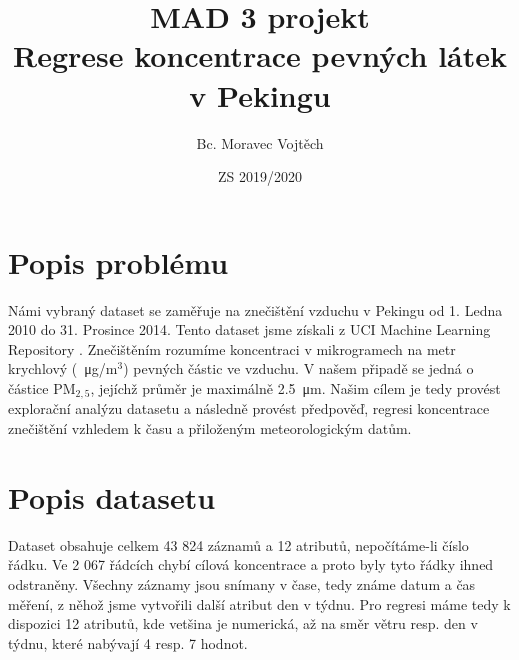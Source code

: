 \documentclass[a4paper,12pt]{article}
\author{Bc. Moravec Vojtěch}
\title{MAD 3 projekt \\ Regrese koncentrace pevných látek v Pekingu }
\date{ZS 2019/2020}
\begin{document}
\maketitle
\newpage

\tableofcontents
\newpage

\section{Popis problému}
Námi vybraný dataset \cite{beijing_data} se zaměřuje na znečištění vzduchu v Pekingu od 1. Ledna 2010 do 31. Prosince 2014.
Tento dataset jsme získali z UCI Machine Learning Repository \cite{Dua:2019}.
Znečištěním rozumíme koncentraci v mikrogramech na metr krychlový (\SI{}{\micro\gram}/$\text{m}^3$) pevných částic ve vzduchu.
V našem připadě se jedná o částice $\text{PM}_{2,5}$, jejíchž průměr je maximálně \SI{2,5}{\micro\metre}.
Našim cílem je tedy provést explorační analýzu datasetu a následně provést předpověď, regresi koncentrace znečištění
vzhledem k času a přiloženým meteorologickým datům.  

\section{Popis datasetu}
Dataset obsahuje celkem 43 824 záznamů a 12 atributů, nepočítáme-li číslo řádku. Ve 2 067 řádcích chybí cílová 
koncentrace a proto byly tyto řádky ihned odstraněny. Všechny záznamy jsou snímany v čase, tedy známe datum a čas měření, z něhož
jsme vytvořili další atribut den v týdnu. Pro regresi máme tedy k dispozici 12 atributů, kde vetšina je numerická, až na směr větru resp. den v týdnu,
které nabývají 4 resp. 7 hodnot.


\end{document}
